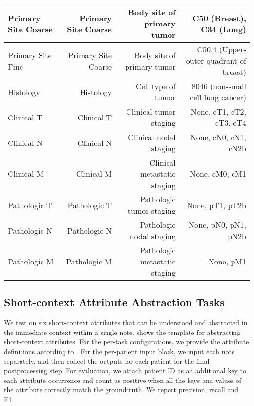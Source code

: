 {\begin{table}[!ht]
{\begin{tabular}{|l|r|r|r|}
    \hline
        Primary Site Coarse & Primary Site Coarse & Body site of primary tumor & C50 (Breast), C34 (Lung)\\
    \hline
        Primary Site Fine & Primary Site Coarse & Body site of primary tumor & C50.4 (Upper-outer quadrant of breast)\\ 
    \hline
        Histology & Histology & Cell type of tumor & 8046 (non-small cell lung cancer) \\
    \hline
        Clinical T & Clinical T & Clinical tumor staging & None, cT1, cT2, cT3, cT4 \\
    \hline
        Clinical N & Clinical N & Clinical nodal staging & None, cN0, cN1, cN2b \\
    \hline
        Clinical M & Clinical M & Clinical metastatic staging & None, cM0, cM1 \\
    \hline
        Pathologic T & Pathologic T & Pathologic tumor staging & None, pT1, pT2b \\
    \hline
        Pathologic N & Pathologic N & Pathologic nodal staging & None, pN0, pN1, pN2b \\
    \hline
        Pathologic M & Pathologic M & Pathologic metastatic staging & None, pM1 \\
        
\hline
    \end{tabular}
    }
    \label{tab:prompt-attribute-keys} 
\end{table}}


\subsection{Short-context Attribute Abstraction Tasks}
We test \ours on six short-context attributes that can be understood and abstracted in the immediate context within a single note. 
 shows the template for abstracting short-context attributes. For the per-task configurations, we provide the attribute definitions according to . 
For the per-patient input block, we input each note separately, and then collect the outputs for each patient for the final postprocessing step. For evaluation, we attach patient ID as an additional key to each attribute occurrence and count as positive when all the keys and values of the attribute correctly match the groundtruth. We report precision, recall and F1. 

